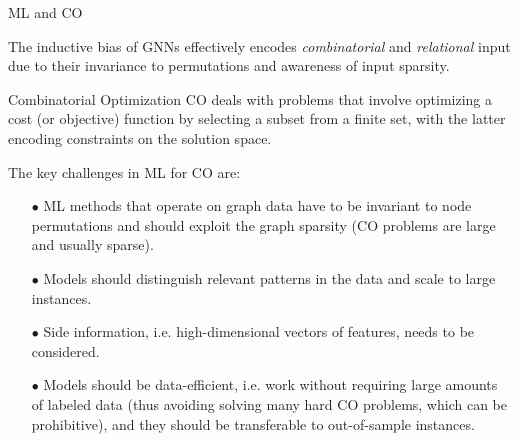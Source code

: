 \documentclass[10pt, aspectratio=169, compress, protectframetitle, handout]{beamer}
\begin{document}
\begin{frame}{ML and CO}

    The inductive bias of GNNs effectively encodes \emph{combinatorial} and \emph{relational} input due to their \alert{invariance to permutations} and \alert{awareness of input sparsity}.
    
    \begin{block}{\alert{Combinatorial Optimization}}
        CO deals with problems that involve optimizing a cost (or objective) function by selecting a subset from a finite set, with the latter encoding constraints on the solution space.
    \end{block}
    
    The key challenges in ML for CO are:
    \begin{itemize}
        \item[\alert{$\bullet$}] ML methods that operate on graph data have to be \alert{invariant} to node \alert{permutations} and should exploit the graph \alert{sparsity} (CO problems are large and usually sparse).
        \item[\alert{$\bullet$}] Models should \alert{distinguish} relevant \alert{patterns} in the data and \alert{scale} to large instances.
        \item[\alert{$\bullet$}] \alert{Side information}, i.e. high-dimensional vectors of features, needs to be considered.
        \item[\alert{$\bullet$}] Models should be \alert{data-efficient}, i.e. work without requiring large amounts of labeled data (thus avoiding solving many hard CO problems, which can be prohibitive), and they should be transferable to \alert{out-of-sample} instances.
    \end{itemize}
    
\end{frame}
\end{document}
